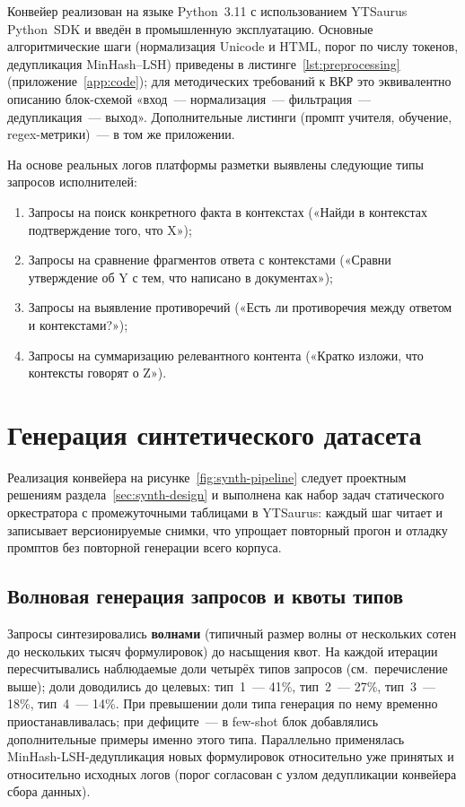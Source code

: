 \documentclass[times]{itmo-student-thesis}
\begin{document}
Конвейер реализован на языке Python~3.11 с использованием YTSaurus
Python~SDK и введён в промышленную эксплуатацию. Основные алгоритмические
шаги (нормализация Unicode и HTML, порог по числу токенов, дедупликация
MinHash--LSH) приведены в листинге~\ref{lst:preprocessing} (приложение~\ref{app:code});
для методических требований к ВКР это эквивалентно описанию блок-схемой
«вход~--- нормализация~--- фильтрация~--- дедупликация~--- выход».
Дополнительные листинги (промпт учителя, обучение, regex-метрики)~---
в том же приложении.

На основе реальных логов платформы разметки выявлены следующие типы
запросов исполнителей:
\begin{enumerate}
    \item Запросы на поиск конкретного факта в контекстах
          («Найди в контекстах подтверждение того, что X»);
    \item Запросы на сравнение фрагментов ответа с контекстами
          («Сравни утверждение об Y с тем, что написано в документах»);
    \item Запросы на выявление противоречий
          («Есть ли противоречия между ответом и контекстами?»);
    \item Запросы на суммаризацию релевантного контента
          («Кратко изложи, что контексты говорят о Z»).
\end{enumerate}

\section{Генерация синтетического датасета}\label{sec:synth-impl}

Реализация конвейера на рисунке~\ref{fig:synth-pipeline} следует
проектным решениям раздела~\ref{sec:synth-design} и выполнена как набор
задач статического оркестратора с промежуточными таблицами в YTSaurus:
каждый шаг читает и записывает версионируемые снимки, что упрощает
повторный прогон и отладку промптов без повторной генерации всего корпуса.

\subsection{Волновая генерация запросов и квоты типов}

Запросы синтезировались \textbf{волнами} (типичный размер волны от
нескольких сотен до нескольких тысяч формулировок) до насыщения квот.
На каждой итерации пересчитывались наблюдаемые доли четырёх типов
запросов (см.~перечисление выше); доли доводились до целевых:
тип~1~--- 41\%, тип~2~--- 27\%, тип~3~--- 18\%, тип~4~--- 14\%.
При превышении доли типа генерация по нему временно приостанавливалась;
при дефиците~--- в few-shot блок добавлялись дополнительные примеры
именно этого типа. Параллельно применялась MinHash-LSH-дедупликация
новых формулировок относительно уже принятых и относительно исходных
логов (порог согласован с узлом дедупликации конвейера сбора данных).
\end{document}
